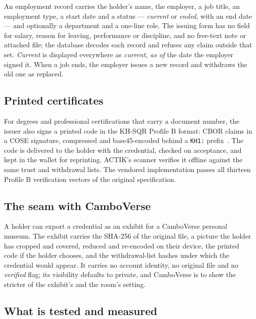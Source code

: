 \documentclass[10pt,a4paper,twocolumn]{article}
\newcommand{\code}[1]{\texttt{\small #1}}
\begin{document}
An employment record carries the holder's name, the employer, a job title, an
employment type, a start date and a status --- \emph{current} or \emph{ended},
with an end date --- and optionally a department and a one-line role. The issuing
form has no field for salary, reason for leaving, performance or discipline, and
no free-text note or attached file; the database decodes each record and refuses
any claim outside that set. \emph{Current} is displayed everywhere as
\emph{current, as of} the date the employer signed it. When a job ends, the
employer issues a new record and withdraws the old one as replaced.

\subsection{Printed certificates}
\label{sec:printed}

For degrees and professional certifications that carry a document number, the
issuer also signs a printed code in the KH-SQR Profile B format: CBOR claims in a
COSE signature, compressed and base45-encoded behind a \code{KH1:}
prefix~\citep{chay2026qrseal,rfc9052}. The code is delivered to the holder with
the credential, checked on acceptance, and kept in the wallet for reprinting.
ACTIK's scanner verifies it offline against the same trust and withdrawal lists.
The vendored implementation passes all thirteen Profile B verification vectors of
the original specification.

\subsection{The seam with CamboVerse}
\label{sec:seam}

A holder can export a credential as an exhibit for a CamboVerse personal museum.
The exhibit carries the SHA-256 of the original file, a picture the holder has
cropped and covered, reduced and re-encoded on their device, the printed code if
the holder chooses, and the withdrawal-list hashes under which the credential
would appear. It carries no account identity, no original file and no
\emph{verified} flag; its visibility defaults to private, and CamboVerse is to show
the stricter of the exhibit's and the room's setting.

\subsection{What is tested and measured}
\label{sec:tested}
\end{document}
